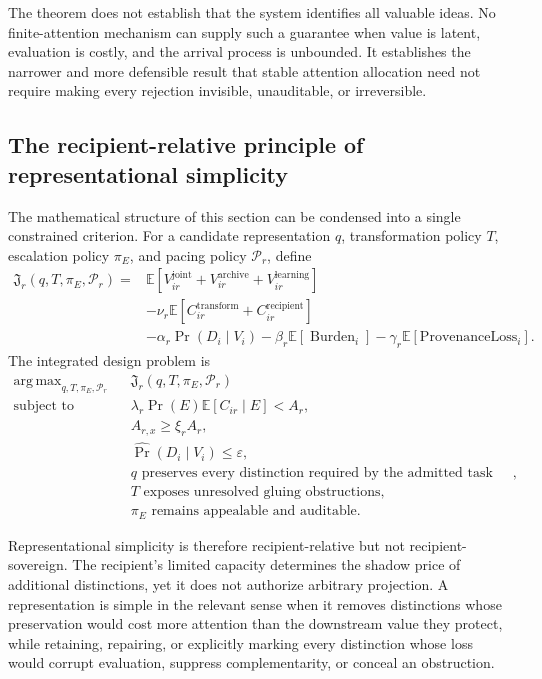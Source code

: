 \documentclass[11pt]{article}
\theoremstyle{definition}
\DeclareMathOperator{\argmax}{arg\,max}
\DeclareMathOperator{\Burden}{Burden}
\newcommand{\E}{\mathbb{E}}
\newcommand{\eps}{\varepsilon}
\begin{document}
The theorem does not establish that the system identifies all valuable ideas. No finite-attention mechanism can supply such a guarantee when value is latent, evaluation is costly, and the arrival process is unbounded. It establishes the narrower and more defensible result that stable attention allocation need not require making every rejection invisible, unauditable, or irreversible.

\subsection{The recipient-relative principle of representational simplicity}

The mathematical structure of this section can be condensed into a single constrained criterion. For a candidate representation \(q\), transformation policy \(T\), escalation policy \(\pi_E\), and pacing policy \(\mathcal{P}_r\), define
\[
\begin{aligned}
\mathfrak{J}_r(q,T,\pi_E,\mathcal{P}_r)
={}&
\E\!\left[
V_{ir}^{\mathrm{joint}}
+
V_{ir}^{\mathrm{archive}}
+
V_{ir}^{\mathrm{learning}}
\right]
\\
&-
\nu_r
\E\!\left[
C_{ir}^{\mathrm{transform}}
+
C_{ir}^{\mathrm{recipient}}
\right]
\\
&-
\alpha_r
\Pr(D_i\mid V_i)
-
\beta_r
\E[\Burden_i]
-
\gamma_r
\E[\mathrm{ProvenanceLoss}_i].
\end{aligned}
\]
The integrated design problem is
\[
\begin{aligned}
\argmax_{q,T,\pi_E,\mathcal{P}_r}
\quad&
\mathfrak{J}_r(q,T,\pi_E,\mathcal{P}_r)
\\
\text{subject to}\quad&
\lambda_r\Pr(E)
\E[C_{ir}\mid E]
<
A_r,
\\
&
A_{r,x}\geq\xi_rA_r,
\\
&
\widehat{\Pr}(D_i\mid V_i)\leq\eps,
\\
&
q\text{ preserves every distinction required by the admitted task class},
\\
&
T\text{ exposes unresolved gluing obstructions},
\\
&
\pi_E\text{ remains appealable and auditable}.
\end{aligned}
\]

Representational simplicity is therefore recipient-relative but not recipient-sovereign. The recipient's limited capacity determines the shadow price of additional distinctions, yet it does not authorize arbitrary projection. A representation is simple in the relevant sense when it removes distinctions whose preservation would cost more attention than the downstream value they protect, while retaining, repairing, or explicitly marking every distinction whose loss would corrupt evaluation, suppress complementarity, or conceal an obstruction.
\end{document}
